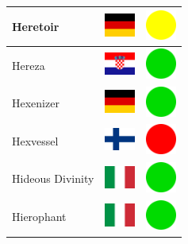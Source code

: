 \documentclass[12pt, a4paper, twoside]{report}
\begin{document}
\begin{center}
\begin{longtable}{|p{5cm}|p{2cm}|p{2cm}|}
 Heretoir                                                   & \includegraphics[width=1cm]{../4x3/de} &   \includegraphics[width=1cm]{../likes/m} \\ \hline
 Hereza                                                     & \includegraphics[width=1cm]{../4x3/hr} &   \includegraphics[width=1cm]{../likes/y} \\ \hline
 Hexenizer                                                  & \includegraphics[width=1cm]{../4x3/de} &   \includegraphics[width=1cm]{../likes/y} \\ \hline
 Hexvessel                                                  & \includegraphics[width=1cm]{../4x3/fi} &   \includegraphics[width=1cm]{../likes/n} \\ \hline
 Hideous Divinity                                           & \includegraphics[width=1cm]{../4x3/it} &   \includegraphics[width=1cm]{../likes/y} \\ \hline
 Hierophant                                                 & \includegraphics[width=1cm]{../4x3/it} &   \includegraphics[width=1cm]{../likes/y} \\ \hline

\end{longtable}
\end{center}
\end{document}
